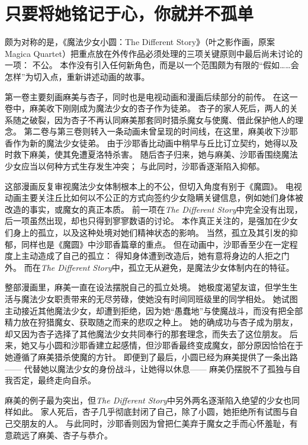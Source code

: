 \chapter[只要将她铭记于心，你就并不孤单]{只要将她铭记于心，你就并不孤单}


颇为对称的是，《魔法少女小圆：The Different Story》（叶之影作画，原案 Magica Quartet）把重点放在外传作品必须处理的三项关键原则中最后尚未讨论的一项：
不公。
本作没有引入任何新角色，而是以一个范围颇为有限的“假如……会怎样”为切入点，重新讲述动画的故事。

第一卷主要刻画麻美与杏子，同时也是电视动画和漫画后续部分的前传。
在这一卷中，麻美收下刚刚成为魔法少女的杏子作为徒弟。
杏子的家人死后，两人的关系随之破裂，因为杏子不再认同麻美那套同时猎杀魔女与使魔、借此保护他人的理念。
第二卷与第三卷则转入一条动画未曾呈现的时间线，在这里，麻美收下沙耶香作为新的魔法少女徒弟。
由于沙耶香比动画中稍早与丘比订立契约，她得以及时救下麻美，使其免遭夏洛特杀害。
随后杏子归来，她与麻美、沙耶香围绕魔法少女应当以何种方式生存发生冲突；
与此同时，沙耶香逐渐陷入抑郁。

这部漫画反复审视魔法少女体制根本上的不公，但切入角度有别于《魔圆》。
电视动画主要关注丘比如何以不公正的方式向签约少女隐瞒关键信息，例如她们身体被改造的事实，或魔女的真正本质。
前一项在\emph{The Different Story}中完全没有出现，后一项虽然出现，却也只得到寥寥数语的讨论。
本作真正关注的，是强加在少女们身上的孤立，以及这种处境对她们精神状态的影响。
当然，孤立及其引发的抑郁，同样也是《魔圆》中沙耶香篇章的重点。
但在动画中，沙耶香至少在一定程度上主动造成了自己的孤立：
得知身体遭到改造后，她有意将身边的人拒之门外。
而在\emph{The Different Story}中，孤立无从避免，是魔法少女体制内在的特征。

整部漫画里，麻美一直在设法摆脱自己的孤立处境。
她极度渴望友谊，但学生生活与魔法少女职责带来的无尽劳碌，使她没有时间同班级里的同学相处。
她试图主动接近其他魔法少女，却遭到拒绝，因为她“愚蠢地”与使魔战斗，而没有把全部精力放在狩猎魔女、获取随之而来的悲叹之种上。
她的确成功与杏子成为朋友，却又因为杏子选择了其他魔法少女共同奉行的那套理念，而失去了这位朋友。
后来，她又与小圆和沙耶香建立起感情，但沙耶香最终变成魔女，部分原因恰恰在于她遵循了麻美猎杀使魔的方针。
即便到了最后，小圆已经为麻美提供了一条出路——
代替她以魔法少女的身份战斗，让她得以休息——
麻美仍摆脱不了孤独与自我否定，最终走向自杀。

麻美的例子最为突出，但\emph{The Different Story}中另外两名逐渐陷入绝望的少女也同样如此。
家人死后，杏子几乎彻底封闭了自己，除了小圆，她拒绝所有试图与自己交朋友的人。
与此同时，沙耶香则因为曾把仁美弃于魔女之手而心怀羞耻，有意疏远了麻美、杏子与恭介。


